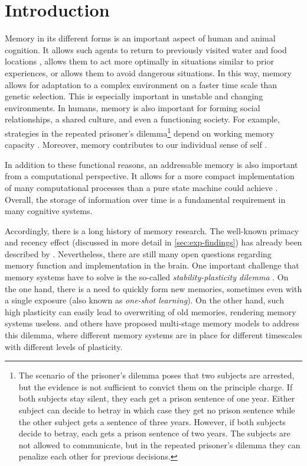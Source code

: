 \chapter{Introduction}

Memory in its different forms is an important aspect of human and animal cognition.
It allows such agents to return to previously visited water and food locations \parencite{vorhees2014}, allows them to act more optimally in situations similar to prior experiences, or allows them to avoid dangerous situations.
In this way, memory allows for adaptation to a complex environment on a faster time scale than genetic selection.
This is especially important in unstable and changing environments.
In humans, memory is also important for forming social relationships, a shared culture, and even a functioning society.
For example, strategies in the repeated prisoner's
dilemma\footnote{The scenario of the prisoner's dilemma poses that two subjects are arrested, but the evidence is not sufficient to convict them on the principle charge. If both subjects stay silent, they each get a prison sentence of one year. Either subject can decide to betray in which case they get no prison sentence while the other subject gets a sentence of three years. However, if both subjects decide to betray, each gets a prison sentence of two years. The subjects are not allowed to communicate, but in the repeated prisoner's dilemma they can penalize each other for previous decisions.} depend on working memory capacity \parencite{milinski1998}.
Moreover, memory contributes to our individual sense of self \parencite{prebble2013}.

In addition to these functional reasons, an addressable memory is also important from a computational perspective.
It allows for a more compact implementation of many computational processes than a pure state machine could achieve \parencite{gallistel2009}.
Overall, the storage of information over time is a fundamental requirement in many cognitive systems.

Accordingly, there is a long history of memory research.
The well-known primacy and recency effect (discussed in more detail in \cref{sec:exp-findings}) has already been described by \textcite{Robinson1926}.
Nevertheless, there are still many open questions regarding memory function and implementation in the brain.
One important challenge that memory systems have to solve is the so-called \emph{stability-plasticity dilemma} \parencite{Abraham2005}.
On the one hand, there is a need to quickly form new memories, sometimes even with a single exposure (also known as \emph{one-shot learning}).
On the other hand, such high plasticity can easily lead to overwriting of old memories, rendering memory systems useless.
\Textcite{Buzsaki1989} and others have proposed multi-stage memory models to address this dilemma, where different memory systems are in place for different timescales with different levels of plasticity.

